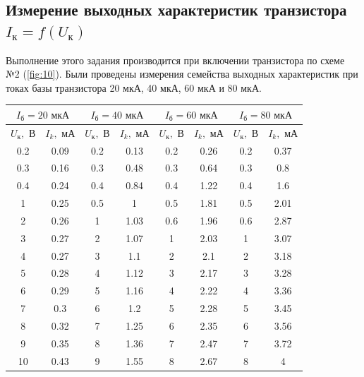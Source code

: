 \subsection{Измерение выходных характеристик транзистора $I_\text{к}=f(U_\text{к})$}
Выполнение этого задания производится при включении транзистора по
схеме №2 (\ref{fig:10}). Были проведены измерения семейства выходных характеристик
при токах базы транзистора 20 мкА, 40 мкА, 60 мкА и 80 мкА.
\begin{table}[htbp]
	\centering
	\begin{tabular}{|c|c|c|c|c|c|c|c|}
		\toprule
		\multicolumn{2}{|c|}{$I_\text{б}=20\text{ мкА}$} & \multicolumn{2}{c|}{$I_\text{б}=40\text{ мкА}$} & \multicolumn{2}{c|}{$I_\text{б}=60\text{ мкА}$} & \multicolumn{2}{c|}{$I_\text{б}=80\text{ мкА}$} \\
		\midrule
		$U_\text{к}, \text{ В}$  & $I_k, \text{ мА}$ & $U_\text{к}, \text{ В}$  & $I_k, \text{ мА}$ & $U_\text{к}, \text{ В}$  & $I_k, \text{ мА}$ & $U_\text{к}, \text{ В}$  & $I_k, \text{ мА}$ \\
		\midrule
		0.2   & 0.09  & 0.2   & 0.13  & 0.2   & 0.26  & 0.2   & 0.37 \\
		\midrule
		0.3   & 0.16  & 0.3   & 0.48  & 0.3   & 0.64  & 0.3   & 0.8 \\
		\midrule
		0.4   & 0.24  & 0.4   & 0.84  & 0.4   & 1.22  & 0.4   & 1.6 \\
		\midrule
		1     & 0.25  & 0.5   & 1     & 0.5   & 1.81  & 0.5   & 2.01 \\
		\midrule
		2     & 0.26  & 1     & 1.03  & 0.6   & 1.96  & 0.6   & 2.87 \\
		\midrule
		3     & 0.27  & 2     & 1.07  & 1     & 2.03  & 1     & 3.07 \\
		\midrule
		4     & 0.27  & 3     & 1.1   & 2     & 2.1   & 2     & 3.18 \\
		\midrule
		5     & 0.28  & 4     & 1.12  & 3     & 2.17  & 3     & 3.28 \\
		\midrule
		6     & 0.29  & 5     & 1.16  & 4     & 2.22  & 4     & 3.36 \\
		\midrule
		7     & 0.3   & 6     & 1.2   & 5     & 2.28  & 5     & 3.45 \\
		\midrule
		8     & 0.32  & 7     & 1.25  & 6     & 2.35  & 6     & 3.56 \\
		\midrule
		9     & 0.35  & 8     & 1.36  & 7     & 2.47  & 7     & 3.72 \\
		\midrule
		10    & 0.43  & 9     & 1.55  & 8     & 2.67  & 8     & 4 \\

\end{tabular}
\end{table}
